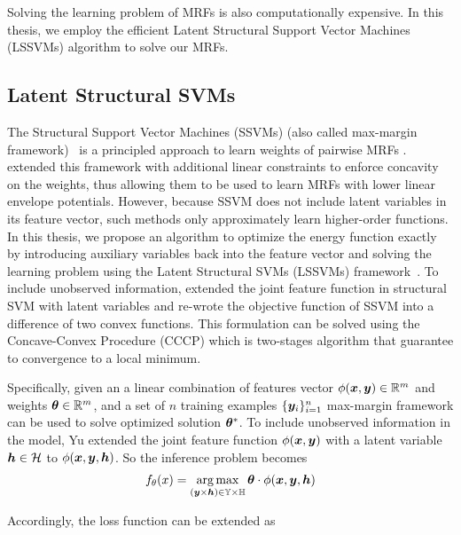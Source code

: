 Solving the learning problem of MRFs is also computationally
expensive. In this thesis, we employ the efficient Latent
Structural Support Vector Machines (LSSVMs) algorithm to solve
our MRFs.

\subsection{Latent Structural SVMs}
\label{sec:latent-struct-svms}

The Structural Support Vector Machines (SSVMs) (also called
max-margin
framework)~\cite{Taskar:ICML05,tsochantaridis2005large} is a
principled approach to learn weights of pairwise MRFs
.
 extended this framework with additional
linear constraints to enforce concavity on the weights, thus
allowing them to be used to learn MRFs with lower linear envelope
potentials. However, because SSVM does not include latent
variables in its feature vector, such methods only approximately
learn higher-order functions. In this thesis, we propose an
algorithm to optimize the energy function exactly by introducing
auxiliary variables back into the feature vector and solving the
learning problem using the Latent Structural SVMs (LSSVMs)
framework~\cite{yu2009learning}. To include unobserved
information,  extended the joint feature
function in structural SVM with latent variables and re-wrote the
objective function of SSVM into a difference of two convex
functions. This formulation can be solved using the
Concave-Convex Procedure (CCCP)\cite{yuille2002concave} which is
two-stages algorithm that guarantee to convergence to a local
minimum.

Specifically, given an a linear combination of features vector
$\phi({\bm{x}} ,{\bm{y}}) \in {\mathbb{R}}^m$ and weights ${\bm{\theta}} \in {\mathbb{R}}^m$, and a
set of $n$ training examples $\{{\bm{y}}_i\}_{i=1}^n$ max-margin
framework can be used to solve optimized solution ${\bm{\theta}}^*$. To
include unobserved information in the model,
Yu\cite{yu2009learning} extended the joint feature
function\cite{tsochantaridis2005large} $\phi({\bm{x}},{\bm{y}}) $ with a
latent variable ${\bm{h}}\in \mathcal{H}$ to $\phi({\bm{x}},{\bm{y}},{\bm{h}}) $. So
the inference problem becomes
\begin{align}
  \label{eq:latent_ssvm_linearcomb}
  f_\theta(x) = \operatorname*{arg\,max}_{({\bm{y}} \times {\bm{h}}) \in {\mathbb{Y}}
  \times {\mathbb{H}}} {\bm{\theta}}\cdot\phi({\bm{x}},{\bm{y}},{\bm{h}})
\end{align}

Accordingly, the loss function can be extended as

